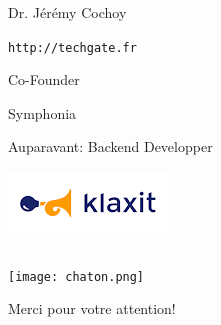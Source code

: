\documentclass{beamer}
\begin{document}
\begin{frame}
\begin{columns}[T]
\begin{column}{0.5\textwidth}
\begin{block}{Dr. Jérémy Cochoy}
\begin{center}
         \verb!http://techgate.fr!
      \end{center}
      \end{block}
      \begin{block}{Co-Founder}
        \begin{center}
          Symphonia
        \end{center}
      \end{block}
      \begin{block}{Auparavant: Backend Developper}
        \begin{center}
          \includegraphics[scale=0.4]{klaxit}
        \end{center}
      \end{block}
    \end{column}
  \end{columns}
\end{frame}

\begin{frame}
  \begin{center}
    \texttt{[image: chaton.png]}
  \end{center}
  \begin{center}
    Merci pour votre attention!
  \end{center}
\end{frame}
\end{document}
